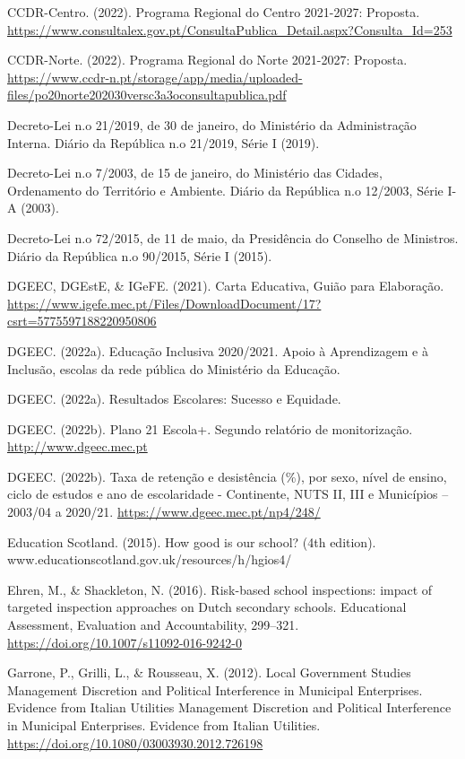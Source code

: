\documentclass[
]{book}
\begin{document}
CCDR-Centro. (2022). Programa Regional do Centro 2021-2027: Proposta. \url{https://www.consultalex.gov.pt/ConsultaPublica_Detail.aspx?Consulta_Id=253}

CCDR-Norte. (2022). Programa Regional do Norte 2021-2027: Proposta. \url{https://www.ccdr-n.pt/storage/app/media/uploaded-files/po20norte202030versc3a3oconsultapublica.pdf}

Decreto-Lei n.o 21/2019, de 30 de janeiro, do Ministério da Administração Interna. Diário da República n.o 21/2019, Série I (2019).

Decreto-Lei n.o 7/2003, de 15 de janeiro, do Ministério das Cidades, Ordenamento do Território e Ambiente. Diário da República n.o 12/2003, Série I-A (2003).

Decreto-Lei n.o 72/2015, de 11 de maio, da Presidência do Conselho de Ministros. Diário da República n.o 90/2015, Série I (2015).

DGEEC, DGEstE, \& IGeFE. (2021). Carta Educativa, Guião para Elaboração. \url{https://www.igefe.mec.pt/Files/DownloadDocument/17?csrt=5775597188220950806}

DGEEC. (2022a). Educação Inclusiva 2020/2021. Apoio à Aprendizagem e à Inclusão, escolas da rede pública do Ministério da Educação.

DGEEC. (2022a). Resultados Escolares: Sucesso e Equidade.

DGEEC. (2022b). Plano 21 Escola+. Segundo relatório de monitorização. \url{http://www.dgeec.mec.pt}

DGEEC. (2022b). Taxa de retenção e desistência (\%), por sexo, nível de ensino, ciclo de estudos e ano de escolaridade - Continente, NUTS II, III e Municípios -- 2003/04 a 2020/21. \url{https://www.dgeec.mec.pt/np4/248/}

Education Scotland. (2015). How good is our school? (4th edition). www.educationscotland.gov.uk/resources/h/hgios4/

Ehren, M., \& Shackleton, N. (2016). Risk-based school inspections: impact of targeted inspection approaches on Dutch secondary schools. Educational Assessment, Evaluation and Accountability, 299--321. \url{https://doi.org/10.1007/s11092-016-9242-0}

Garrone, P., Grilli, L., \& Rousseau, X. (2012). Local Government Studies Management Discretion and Political Interference in Municipal Enterprises. Evidence from Italian Utilities Management Discretion and Political Interference in Municipal Enterprises. Evidence from Italian Utilities. \url{https://doi.org/10.1080/03003930.2012.726198}
\end{document}
